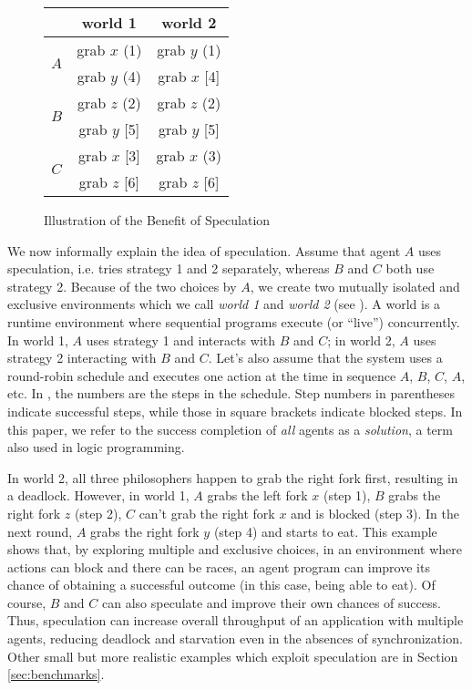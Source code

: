 \begin{figure}[bh]
\centering
\begin{tabular}{c|c|c}
& world 1 & world 2 \\
\hline
\multirow{2}{*}{$A$}
    & grab $x$ (1) & grab $y$ (1) \\
    & grab $y$ (4) & grab $x$ [4] \\
\hline
\multirow{2}{*}{$B$}
    & grab $z$ (2) & grab $z$ (2) \\
    & grab $y$ [5] & grab $y$ [5] \\
\hline
\multirow{2}{*}{$C$}
    & grab $x$ [3] & grab $x$ (3) \\
    & grab $z$ [6] & grab $z$ [6]
\end{tabular}
\caption{Illustration of the Benefit of Speculation}
\label{fig:illus}
\end{figure}

We now informally explain the idea of speculation.
Assume that agent $A$ uses speculation, i.e.
tries strategy 1 and 2 separately,
whereas $B$ and $C$ both use strategy 2. Because of the two choices by $A$, 
we create two mutually isolated and exclusive environments which we call
{\em world 1} and {\em world 2} (see ). 
A world is a runtime environment where
sequential programs execute (or ``live'') concurrently. 
In world 1, $A$ uses strategy
1 and interacts with $B$ and $C$; in world 2, 
$A$ uses strategy 2 interacting with $B$ and $C$. 
Let's also assume that the system uses a round-robin schedule and
executes one action at the time in sequence $A$, $B$, $C$, $A$, etc.
In , the numbers are the steps in the schedule.
Step numbers in parentheses indicate successful steps,
while those in square brackets indicate blocked steps. 
In this paper, we refer to the success completion of {\em all} 
agents as a {\em solution}, a term also used in 
logic programming. 

In world 2, all three philosophers happen to grab the right fork first, 
resulting in a deadlock. 
However, in world 1, $A$ grabs the left fork $x$ (step 1),
$B$ grabs the right fork $z$ (step 2), $C$ can't
grab the right fork $x$ and is blocked (step 3). In the next round,
$A$ grabs the right fork $y$ (step 4) and starts to eat.
This example shows that, by exploring multiple and exclusive choices, 
in an environment where actions can block and there can be races,
an agent program can improve its chance of obtaining a successful outcome
(in this case, being able to eat). 
Of course, $B$ and $C$ can also speculate and improve
their own chances of success. Thus, speculation can increase overall throughput
of an application with multiple agents, reducing deadlock and starvation
even in the absences of synchronization.
Other small but more realistic examples which 
exploit speculation are in Section \ref{sec:benchmarks}.

